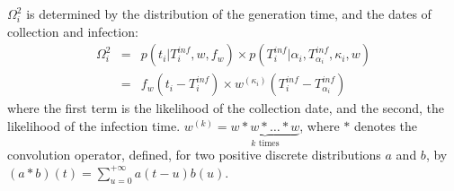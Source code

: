 \documentclass[10pt]{article}
\begin{document}
$\Omega_i^2$ is determined by the distribution of the generation time, and the dates of collection and infection:
\begin{eqnarray}
 \Omega_i^2 & = & p(t_i | T_i^{inf}, w, f_w) \times p(T_i^{inf}| \alpha_i, T_{\alpha_i}^{inf}, \kappa_i, w) \nonumber \\
& = &  f_w(t_i - T_i^{inf}) \times  w^{\left(\kappa_i\right)}(T_i^{inf} - T_{\alpha_i}^{inf})
\end{eqnarray}
where the first term is the likelihood of the collection date, and the second, the likelihood of the infection time.
$w^{\left(k\right)} = \underbrace{w*w*\ldots*w}_{k \text{ times}} $, where $*$ denotes the convolution operator, defined, for two positive discrete distributions $a$ and $b$, by $\left(a*b\right)\left(t\right) = \sum_{u=0}^{+\infty} a\left(t-u\right)b\left(u\right)$. 
\\

% 
~\\
\end{document}
